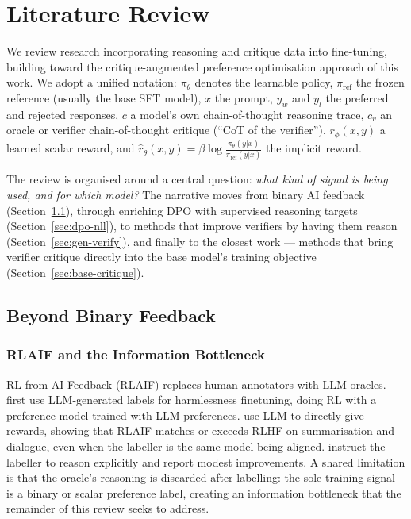 \section{Literature Review}
\label{sec:lit}

We review research incorporating reasoning and critique data into fine-tuning, building toward the critique-augmented preference optimisation approach of this work. We adopt a unified notation: $\pi_\theta$ denotes the learnable policy, $\pi_{\text{ref}}$ the frozen reference (usually the base SFT model), $x$ the prompt, $y_w$ and $y_l$ the preferred and rejected responses, $c$ a model's own chain-of-thought reasoning trace, $c_v$ an oracle or verifier chain-of-thought critique (``CoT of the verifier''), $r_\phi(x,y)$ a learned scalar reward, and $\hat{r}_\theta(x,y) = \beta \log \frac{\pi_\theta(y|x)}{\pi_{\text{ref}}(y|x)}$ the implicit reward.

The review is organised around a central question: \textit{what kind of signal is being used, and for which model?} The narrative moves from binary AI feedback (Section~\ref{sec:cot-motivation}), through enriching DPO with supervised reasoning targets (Section~\ref{sec:dpo-nll}), to methods that improve verifiers by having them reason (Section~\ref{sec:gen-verify}), and finally to the closest work --- methods that bring verifier critique directly into the base model's training objective (Section~\ref{sec:base-critique}).

\subsection{Beyond Binary Feedback}
\label{sec:cot-motivation}

\subsubsection{RLAIF and the Information Bottleneck}

RL from AI Feedback (RLAIF) replaces human annotators with LLM oracles. \autocite{bai2022constitutionalaiharmlessnessai} first use LLM-generated labels for harmlessness finetuning, doing RL with a preference model trained with LLM preferences. \autocite{lee2024rlaifvsrlhfscaling} use LLM to directly give rewards, showing that RLAIF matches or exceeds RLHF on summarisation and dialogue, even when the labeller is the same model being aligned. \autocite{li2024hrlaifimprovementshelpfulnessharmlessness} instruct the labeller to reason explicitly and report modest improvements. A shared limitation is that the oracle's reasoning is discarded after labelling: the sole training signal is a binary or scalar preference label, creating an information bottleneck that the remainder of this review seeks to address.

